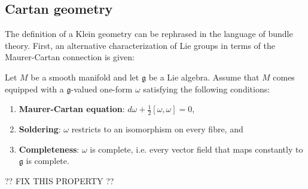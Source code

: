 
\subsection{Cartan geometry}

    The definition of a Klein geometry can be rephrased in the language of bundle theory. First, an alternative characterization of Lie groups in terms of the Maurer-Cartan connection is given:
    \begin{adefinition}
        Let $M$ be a smooth manifold and let $\mathfrak{g}$ be a Lie algebra. Assume that $M$ comes equipped with a $\mathfrak{g}$-valued one-form $\omega$ satisfying the following conditions:
        \begin{enumerate}
            \item\textbf{Maurer-Cartan equation}: $d\omega + \frac{1}{2}[\omega,\omega]=0$,
            \item\textbf{Soldering}: $\omega$ restricts to an isomorphism on every fibre, and
            \item\textbf{Completeness}: $\omega$ is complete, i.e. every vector field that maps constantly to $\mathfrak{g}$ is complete.
        \end{enumerate}

        ?? FIX THIS PROPERTY ??
    \end{adefinition}

